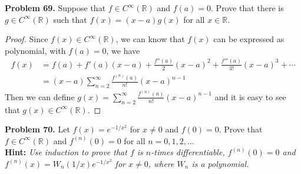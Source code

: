 \documentclass[12pt,leqno]{amsart}
\theoremstyle{definition}
\begin{document}
\medskip

\noindent
{\bf Problem 69.}
Suppose that $f\in C^\infty(\mathbb{R})$ and $f(a)=0$. Prove that there is $g\in C^\infty(\mathbb{R})$ such that $f(x)=(x-a)g(x)$ for all $x\in\mathbb{R}$.
\begin{proof}
Since $f(x)\in C^\infty(\mathbb{R})$, we can know that $f(x)$ can be expressed as polynomial, with $f(a) = 0$, we have
\begin{align*}
    f(x) & = f(a) + f'(a)(x-a) + \frac{f''(a)}{2}(x-a)^2 + \frac{f'''(a)}{3!}(x-a)^3 + \cdots \\
    & = (x-a)\sum^\infty_{n=2}\frac{f^{(n)}(a)}{n!}(x-a)^{n-1}
\end{align*}
Then we can define $g(x) = \sum^\infty_{n=2}\frac{f^{(n)}(a)}{n!}(x-a)^{n-1}$ and it is easy to see that $g(x)\in C^\infty(\mathbb{R})$.
\end{proof}

\medskip

\noindent
{\bf Problem 70.}
Let $f(x)=e^{-1/x^2}$ for $x\neq 0$ and $f(0)=0$. Prove that $f\in C^\infty(\mathbb{R})$ and $f^{(n)}(0)=0$ for all $n=0,1,2,\ldots$\\
{\bf Hint:} {\em Use induction to prove that $f$ is $n$-times differentiable, $f^{(n)}(0)=0$ and $f^{(n)}(x)=W_n(1/x)e^{-1/x^2}$ for $x\neq 0$, where $W_n$ is a polynomial.}
\end{document}
